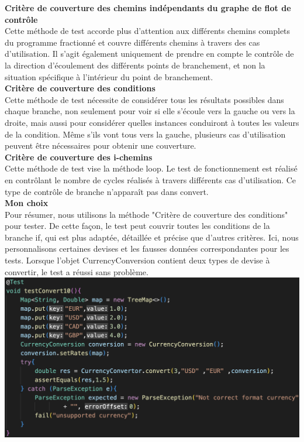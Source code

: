 \documentclass{article}
\begin{document}
\textbf{Critère de couverture des chemins indépendants du graphe de flot de contrôle}\\
Cette méthode de test accorde plus d'attention aux différents chemins complets du programme fractionné et couvre différents chemins à travers des cas d'utilisation. Il s'agit également uniquement de prendre en compte le contrôle de la direction d'écoulement des différents points de branchement, et non la situation spécifique à l'intérieur du point de branchement.\\

\textbf{Critère de couverture des conditions}\\
Cette méthode de test nécessite de considérer tous les résultats possibles dans chaque branche, non seulement pour voir si elle s'écoule vers la gauche ou vers la droite, mais aussi pour considérer quelles instances conduiront à toutes les valeurs de la condition. Même s'ils vont tous vers la gauche, plusieurs cas d'utilisation peuvent être nécessaires pour obtenir une couverture.\\

\textbf{Critère de couverture des i-chemins}\\
Cette méthode de test vise la méthode loop. Le test de fonctionnement est réalisé en contrôlant le nombre de cycles réalisés à travers différents cas d'utilisation. Ce type de contrôle de branche n'apparaît pas dans convert.\\

\textbf{Mon choix}\\
Pour résumer, nous utilisons la méthode "Critère de couverture des conditions" pour tester. De cette façon, le test peut couvrir toutes les conditions de la branche if, qui est plus adaptée, détaillée et précise que d'autres critères.
Ici, nous personnalisons certaines devises et les fausses données correspondantes pour les tests. Lorsque l'objet CurrencyConversion contient deux types de devise à convertir, le test a réussi sans problème.\\

\includegraphics[scale=0.3]{G6.png}\\
\end{document}
